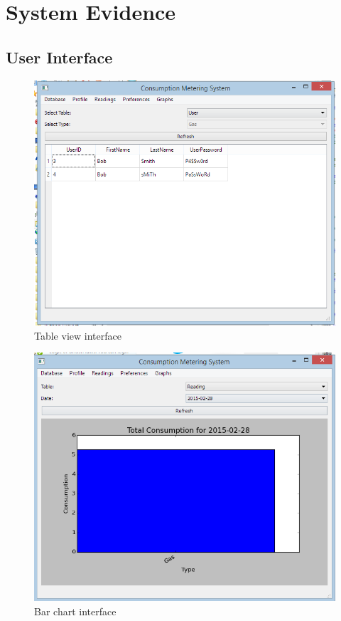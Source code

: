 \section{System Evidence}

\subsection{User Interface}
\begin{landscape}
\begin{figure}[H]
	\includegraphics{./maintenance/images/UI_Table_View.png}
	\caption{Table view interface}
\end{figure}

\begin{figure}[H]
	\includegraphics{./maintenance/images/UI_Bar_View.png}
	\caption{Bar chart interface}
\end{figure}


\end{landscape}
